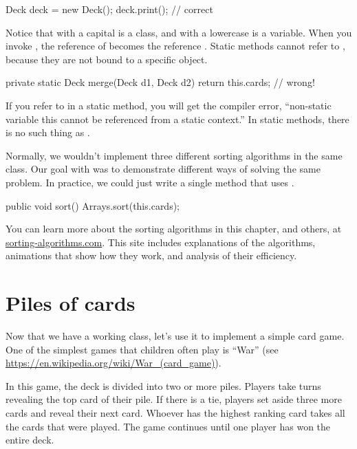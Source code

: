 \begin{code}
Deck deck = new Deck();
deck.print();  // correct
\end{code}

Notice that  with a capital  is a class, and  with a lowercase  is a variable.
When you invoke , the reference of  becomes the reference .
Static methods cannot refer to , because they are not bound to a specific object.

\begin{code}
private static Deck merge(Deck d1, Deck d2) {
    return this.cards;  // wrong!
}
\end{code}

If you refer to  in a static method, you will get the compiler error, ``non-static variable this cannot be referenced from a static context.''
In static methods, there is no such thing as .


Normally, we wouldn't implement three different sorting algorithms in the same class.
Our goal with  was to demonstrate different ways of solving the same problem.
In practice, we could just write a single  method that uses .

\begin{code}
public void sort() {
    Arrays.sort(this.cards);
}
\end{code}

You can learn more about the sorting algorithms in this chapter, and others, at \href{http://www.sorting-algorithms.com/}{sorting-algorithms.com}.
This site includes explanations of the algorithms, animations that show how they work, and analysis of their efficiency.


\section{Piles of cards}

Now that we have a working  class, let's use it to implement a simple card game.
One of the simplest games that children often play is ``War'' (see \url{https://en.wikipedia.org/wiki/War_(card_game)}).

In this game, the deck is divided into two or more piles.
Players take turns revealing the top card of their pile.
If there is a tie, players set aside three more cards and reveal their next card.
Whoever has the highest ranking card takes all the cards that were played.
The game continues until one player has won the entire deck.


